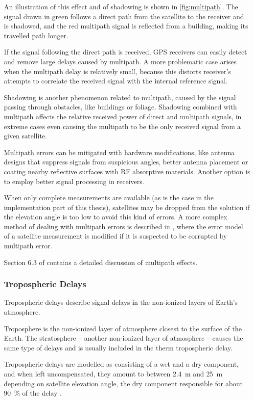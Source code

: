 An illustration of this effect and of shadowing is shown in \cref{fig:multipath}.
The signal drawn in green follows a direct path from the satellite to the receiver and is shadowed,
and the red multipath signal is reflected from a building, making its travelled path longer.

If the signal following the direct path is received, GPS receivers can easily detect and remove large delays caused by multipath.
A more problematic case arises when the multipath delay is relatively small, because this distorts
receiver's attempts to correlate the received signal with the internal reference signal.

Shadowing is another phenomenon related to multipath, caused by the signal passing through obstacles, like buildings or foliage.
Shadowing combined with multipath affects the relative received power of direct and multipath signals, in extreme cases
even causing the multipath to be the only received signal from a given satellite.

Multipath errors can be mitigated with hardware modifications, like antenna designs that suppress signals from suspicious angles,
better antenna placement or coating nearby reflective surfaces with RF absorptive materials.
Another option is to employ better signal processing in receivers.

When only complete measurements are available (as is the case in the implementation part of this thesis),
satellites may be dropped from the solution if the elevation angle
is too low to avoid this kind of errors.
A more complex method of dealing with multipath errors is described in \cite{viandier08},
where the error model of a satellite measurement is modified if it is suspected to be corrupted
by multipath error.

Section 6.3 of \cite{kaplan06} contains a detailed discussion of multipath effects.

\subsubsection{Tropospheric Delays}
Tropospheric delays describe signal delays in the non-ionized layers of Earth's atmosphere.

Troposphere is the non-ionized layer of atmosphere closest to the surface of the Earth.
The stratosphere -- another non-ionized layer of atmosphere -- causes the same
type of delays and is usually included in the therm tropospheric delay.

Tropospheric delays are modelled as consisting of a wet and a dry component,
and when left uncompensated, they amount to between \SI{2.4}{\meter} and \SI{25}{\meter}
depending on satellite elevation angle, the dry component
responsible for about \SI{90}{\percent} of the delay \cite{kaplan06}.

